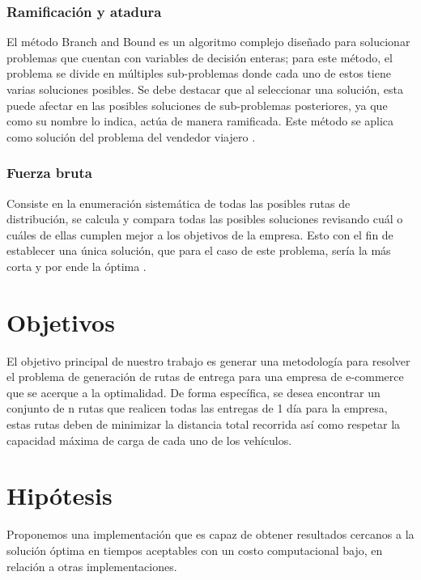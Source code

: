 \documentclass[journal]{IEEEtran}
\begin{document}
        \subsubsection{Ramificación y atadura}
        
            El método Branch and Bound es un algoritmo complejo diseñado para solucionar problemas que cuentan con variables de decisión enteras; para este método, el problema se divide en múltiples sub-problemas donde cada uno de estos tiene varias soluciones posibles. Se debe destacar que al seleccionar una solución, esta puede afectar en las posibles soluciones de sub-problemas posteriores, ya que como su nombre lo indica, actúa de manera ramificada. Este método se aplica como solución del problema del vendedor viajero \cite{trevelingProb}.

        \subsubsection{Fuerza bruta}
        
            Consiste en la enumeración sistemática de todas las posibles rutas de distribución, se calcula y compara todas las posibles soluciones revisando cuál o cuáles de ellas cumplen mejor a los objetivos de la empresa. Esto con el fin de establecer una única solución, que para el caso de este problema, sería la más corta y por ende la óptima \cite{trevelingProb}.
    
    \section{Objetivos}

        El objetivo principal de nuestro trabajo es generar una metodología para resolver el problema de generación de rutas de entrega para una empresa de e-commerce que se acerque a la optimalidad. De forma específica, se desea encontrar un conjunto de n rutas que realicen todas las entregas de 1 día para la empresa, estas rutas deben de minimizar la distancia total recorrida así como respetar la capacidad máxima de carga de cada uno de los vehículos.

    \section{Hipótesis} \label{sec:hyp}
            
        Proponemos una implementación que es capaz de obtener resultados cercanos a la solución óptima en tiempos aceptables con un costo computacional bajo, en relación a otras implementaciones.
        
\end{document}

